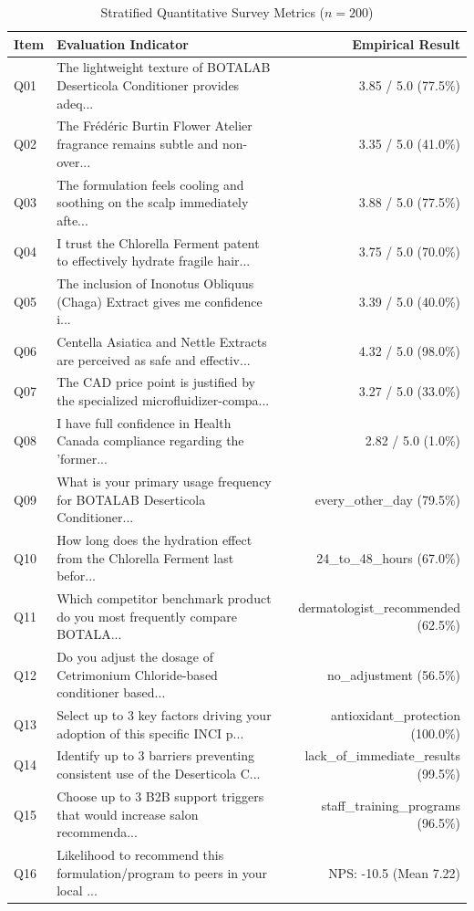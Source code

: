 \documentclass[10pt,twocolumn,a4paper]{article}
\begin{document}
\begin{table}[t]
\centering
\caption{Stratified Quantitative Survey Metrics ($n = 200$)}
\label{tab:metrics}
\small
\begin{tabularx}{\textwidth}{l X r}
\toprule
\textbf{Item} & \textbf{Evaluation Indicator} & \textbf{Empirical Result} \\
\midrule
Q01 & The lightweight texture of BOTALAB Deserticola Conditioner provides adeq... & 3.85 / 5.0 (77.5\%) \\
Q02 & The Frédéric Burtin Flower Atelier fragrance remains subtle and non-over... & 3.35 / 5.0 (41.0\%) \\
Q03 & The formulation feels cooling and soothing on the scalp immediately afte... & 3.88 / 5.0 (77.5\%) \\
Q04 & I trust the Chlorella Ferment patent to effectively hydrate fragile hair... & 3.75 / 5.0 (70.0\%) \\
Q05 & The inclusion of Inonotus Obliquus (Chaga) Extract gives me confidence i... & 3.39 / 5.0 (40.0\%) \\
Q06 & Centella Asiatica and Nettle Extracts are perceived as safe and effectiv... & 4.32 / 5.0 (98.0\%) \\
Q07 & The CAD price point is justified by the specialized microfluidizer-compa... & 3.27 / 5.0 (33.0\%) \\
Q08 & I have full confidence in Health Canada compliance regarding the 'former... & 2.82 / 5.0 (1.0\%) \\
Q09 & What is your primary usage frequency for BOTALAB Deserticola Conditioner... & every\_other\_day (79.5\%) \\
Q10 & How long does the hydration effect from the Chlorella Ferment last befor... & 24\_to\_48\_hours (67.0\%) \\
Q11 & Which competitor benchmark product do you most frequently compare BOTALA... & dermatologist\_recommended (62.5\%) \\
Q12 & Do you adjust the dosage of Cetrimonium Chloride-based conditioner based... & no\_adjustment (56.5\%) \\
Q13 & Select up to 3 key factors driving your adoption of this specific INCI p... & antioxidant\_protection (100.0\%) \\
Q14 & Identify up to 3 barriers preventing consistent use of the Deserticola C... & lack\_of\_immediate\_results (99.5\%) \\
Q15 & Choose up to 3 B2B support triggers that would increase salon recommenda... & staff\_training\_programs (96.5\%) \\
Q16 & Likelihood to recommend this formulation/program to peers in your local ... & NPS: -10.5 (Mean 7.22) \\
\bottomrule
\end{tabularx}
\end{table}
\end{document}
